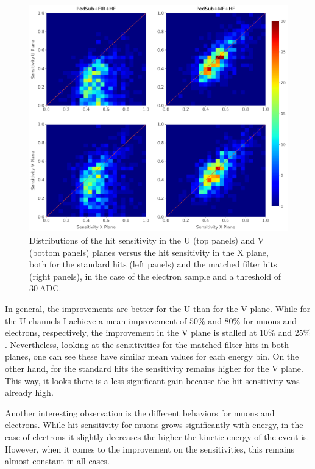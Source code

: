 \begin{figure}[t]
	\centering
	\includegraphics[width=.99\linewidth]{Images/Matched_Filter/hit_study_electron_concurrence}
	\caption[Distributions of the hit sensitivity in the U and V planes versus the sensitivity in the X plane for the standard hits and the matched filter hits in the electron sample.]{Distributions of the hit sensitivity in the U (top panels) and V (bottom panels) planes versus the hit sensitivity in the X plane, both for the standard hits (left panels) and the matched filter hits (right panels), in the case of the electron sample and a threshold of $30 \ \mathrm{ADC}$.}
	\label{fig:electron_concurrence}
\end{figure}

In general, the improvements are better for the U than for the V plane. While for the U channels I achieve a mean improvement of $50\%$ and $80\%$ for muons and electrons, respectively, the improvement in the V plane is stalled at $10\%$ and $25\%$. Nevertheless, looking at the sensitivities for the matched filter hits in both planes, one can see these have similar mean values for each energy bin. On the other hand, for the standard hits the sensitivity remains higher for the V plane. This way, it looks there is a less significant gain because the hit sensitivity was already high.

Another interesting observation is the different behaviors for muons and electrons. While hit sensitivity for muons grows significantly with energy, in the case of electrons it slightly decreases the higher the kinetic energy of the event is. However, when it comes to the improvement on the sensitivities, this remains almost constant in all cases.

